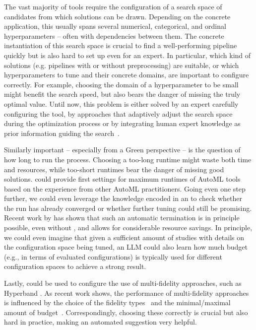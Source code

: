 The vast majority of \AutoML tools require the configuration of a search space of candidates from which solutions can be drawn. Depending on the concrete application, this usually spans several numerical, categorical, and ordinal hyperparameters -- often with dependencies between them. The concrete instantiation of this search space is crucial to find a well-performing pipeline quickly but is also hard to set up even for an expert. In particular, which kind of solutions (e.g. pipelines with or without preprocessing) are suitable, or which hyperparameters to tune and their concrete domains, are important to configure correctly. For example, choosing the domain of a hyperparameter to be small might benefit the search speed, but also bears the danger of missing the truly optimal value. Until now, this problem is either solved by an expert carefully configuring the \AutoML tool, by approaches that adaptively adjust the search space during the optimization process \cite{wistuba-ecml15a,nguyen-knowinfsys19a,hu-ieeetnnls22a,hu-eccv20a,chen-iccv19} or by integrating human expert knowledge as prior information guiding the search~\cite{souza-ecmlpkdd21a,hvarfner-iclr22a,mallik-metaws22a}.

Similarly important -- especially from a Green \AutoML perspective \cite{tornede-jair23a} -- is the question of how long to run the \AutoML process. Choosing a too-long runtime might waste both time and resources, while too-short runtimes bear the danger of missing good solutions. \LLMs could provide first settings for maximum runtimes of AutoML tools based on the experience from other AutoML practitioners. Going even one step further, we could even leverage the knowledge encoded in an \LLM to check whether the \AutoML run has already converged or whether further tuning could still be promising. Recent work by \citet{makarova-automlconf22a} has shown that such an automatic termination is in principle possible, even without \LLMs, and allows for considerable resource savings. In principle, we could even imagine that given a sufficient amount of \AutoML studies with details on the configuration space being tuned, an LLM could also learn how much \AutoML budget (e.g., in terms of evaluated configurations) is typically used for different configuration spaces to achieve a strong result.

Lastly, \LLMs could be used to configure the use of multi-fidelity approaches, such as Hyperband \cite{li-jmlr18a}. As recent work shows, the performance of multi-fidelity approaches is influenced by the choice of the fidelity types~\cite{deng-ecml22a} and the minimal/maximal amount of budget~\cite{bohdal-iclr2023a}. Correspondingly, choosing these correctly is crucial but also hard in practice, making an automated suggestion very helpful.

